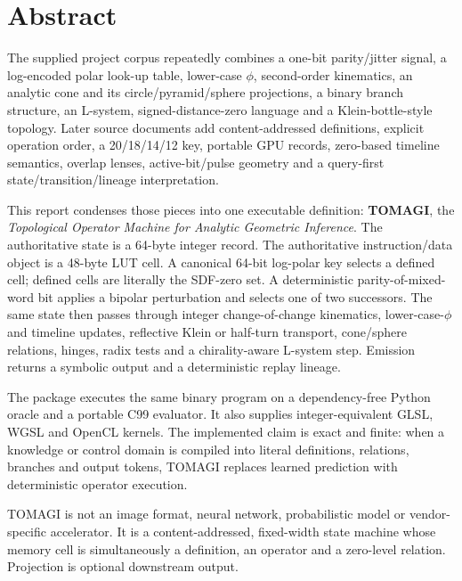 \documentclass[11pt,a4paper]{article}
\begin{document}
\section*{Abstract}
The supplied project corpus repeatedly combines a one-bit parity/jitter signal, a log-encoded polar look-up table, lower-case $\phi$, second-order kinematics, an analytic cone and its circle/pyramid/sphere projections, a binary branch structure, an L-system, signed-distance-zero language and a Klein-bottle-style topology. Later source documents add content-addressed definitions, explicit operation order, a 20/18/14/12 key, portable GPU records, zero-based timeline semantics, overlap lenses, active-bit/pulse geometry and a query-first state/transition/lineage interpretation.

This report condenses those pieces into one executable definition: \textbf{TOMAGI}, the \emph{Topological Operator Machine for Analytic Geometric Inference}. The authoritative state is a 64-byte integer record. The authoritative instruction/data object is a 48-byte LUT cell. A canonical 64-bit log-polar key selects a defined cell; defined cells are literally the SDF-zero set. A deterministic parity-of-mixed-word bit applies a bipolar perturbation and selects one of two successors. The same state then passes through integer change-of-change kinematics, lower-case-$\phi$ and timeline updates, reflective Klein or half-turn transport, cone/sphere relations, hinges, radix tests and a chirality-aware L-system step. Emission returns a symbolic output and a deterministic replay lineage.

The package executes the same binary program on a dependency-free Python oracle and a portable C99 evaluator. It also supplies integer-equivalent GLSL, WGSL and OpenCL kernels. The implemented claim is exact and finite: when a knowledge or control domain is compiled into literal definitions, relations, branches and output tokens, TOMAGI replaces learned prediction with deterministic operator execution.

\begin{decisionbox}
TOMAGI is not an image format, neural network, probabilistic model or vendor-specific accelerator. It is a content-addressed, fixed-width state machine whose memory cell is simultaneously a definition, an operator and a zero-level relation. Projection is optional downstream output.
\end{decisionbox}

\tableofcontents
\listoffigures
\clearpage
{}
\end{document}
